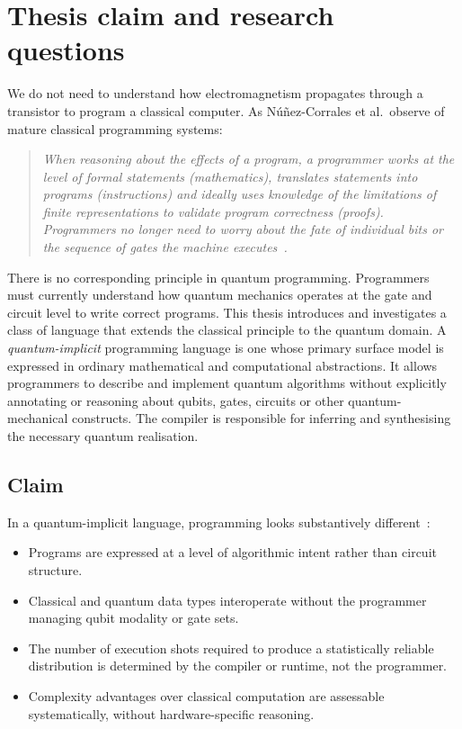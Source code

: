 \section{Thesis claim and research questions}\label{sec:introduction:research_questions}
We do not need to understand how electromagnetism propagates through a transistor to program a classical computer.
As Núñez-Corrales et al.~observe of mature classical programming systems:

\begin{quote}
    \textit{When reasoning about the effects of a program, a programmer works at the level of formal statements (mathematics), translates statements into programs (instructions) and ideally uses knowledge of the limitations of finite representations to validate program correctness (proofs).
    Programmers no longer need to worry about the fate of individual bits or the sequence of gates the machine executes~\cite{nunez_corrales2025betterabstractmachines}.}
\end{quote}

There is no corresponding principle in quantum programming.
Programmers must currently understand how quantum mechanics operates at the gate and circuit level to write correct programs.
This thesis introduces and investigates a class of language that extends the classical principle to the quantum domain.
A \textit{quantum-implicit} programming language is one whose primary surface model is expressed in ordinary mathematical and computational abstractions.
It allows programmers to describe and implement quantum algorithms without explicitly annotating or reasoning about qubits, gates, circuits or other quantum-mechanical constructs.
The compiler is responsible for inferring and synthesising the necessary quantum realisation.

\subsection{Claim}\label{subsec:introduction:research_questions:claim}
In a quantum-implicit language, programming looks substantively
different~\cite{nunez_corrales2025betterabstractmachines}:
\begin{itemize}
    \item Programs are expressed at a level of algorithmic intent rather than circuit structure.
    \item Classical and quantum data types interoperate without the programmer managing qubit modality or gate sets.
    \item The number of execution shots required to produce a statistically reliable distribution is determined by the compiler or runtime, not the programmer.
    \item Complexity advantages over classical computation are assessable systematically, without hardware-specific reasoning.
\end{itemize}

